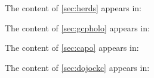 \noindent The content of \cref{sec:herds} appears in:
\vspace{5mm}

\noindent The content of \cref{sec:gcpholo} appears in:
\vspace{5mm}

\noindent The content of \cref{sec:capo} appears in:
\vspace{5mm}

\noindent The content of \cref{sec:dojockc} appears in:
\vspace{5mm}






